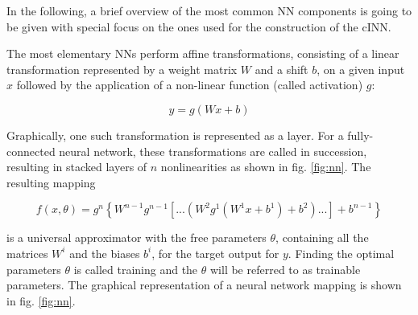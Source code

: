 In the following, a brief overview of the most common NN components is going to be given with special focus on the ones used for the construction of the cINN.

The most elementary NNs perform affine transformations, consisting of a linear transformation represented by a weight matrix $W$ and a shift $b$, on a given input $x$ followed by the application of a non-linear function (called activation) $g$:

\begin{equation*}
	y = g(Wx+b)
\end{equation*}

Graphically, one such transformation is represented as a layer. For a fully-connected neural network, these transformations are called in succession, resulting in stacked layers of $n$ nonlinearities as shown in fig. \ref{fig:nn}. The resulting mapping

\begin{equation*}
	f(x, \theta) = g^n\left\{W^{n-1}g^{n-1}\left[ ... \left(W^2g^1(W^1x+b^1)+b^2\right)...\right]+b^{n-1}\right\}
\end{equation*}

is a universal approximator with the free parameters $\theta$, containing all the matrices $W^i$ and the biases $b^i$, for the target output for $y$. Finding the optimal parameters $\theta$ is called training and the $\theta$ will be referred to as trainable parameters. The graphical representation of a neural network mapping is shown in fig. \ref{fig:nn}.


